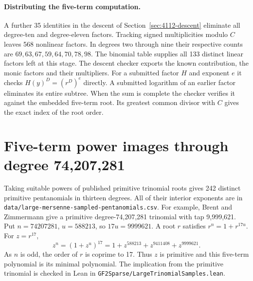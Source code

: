 \documentclass[11pt]{article}
\begin{document}
\paragraph{Distributing the five-term computation.}
A further 35 identities in the descent of Section~\ref{sec:4112-descent}
eliminate all degree-ten and degree-eleven factors. Tracking signed
multiplicities modulo \(C\) leaves 568 nonlinear factors. In degrees
two through nine their respective counts are
\(69,63,67,59,64,70,78,98\). The binomial table supplies all 133
distinct linear factors left at this stage.
The descent checker exports the known contribution, the monic
factors and their multipliers. For a submitted factor \(H\) and
exponent \(e\) it checks \(H(y)^D=(r^D)^e\) directly. A submitted
logarithm of an earlier factor eliminates its entire subtree.
When the sum is complete the checker verifies it against the
embedded five-term root. Its greatest common divisor with \(C\)
gives the exact index of the root order.

\clearpage
\section{Five-term power images through degree 74,207,281}
\label{sec:large-trinomial-samples}

Taking suitable powers of published primitive trinomial roots gives
242 distinct primitive pentanomials in thirteen degrees. All of
their interior exponents are in
\nolinkurl{data/large-mersenne-sampled-pentanomials.csv}.
For example, Brent and Zimmermann give a primitive degree-74,207,281
trinomial with tap 9,999,621. Put \(n=74207281\), \(u=588213\),
so \(17u=9999621\). A root \(r\) satisfies \(r^n=1+r^{17u}\).
For \(z=r^{17}\),
\[
   z^n=(1+z^u)^{17}=1+z^{588213}+z^{9411408}+z^{9999621}.
\]
As \(n\) is odd, the order of \(r\) is coprime to 17. Thus \(z\)
is primitive and this five-term polynomial is its minimal polynomial.
The implication from the primitive trinomial is checked in Lean in
\nolinkurl{GF2Sparse/LargeTrinomialSamples.lean}.
\end{document}
